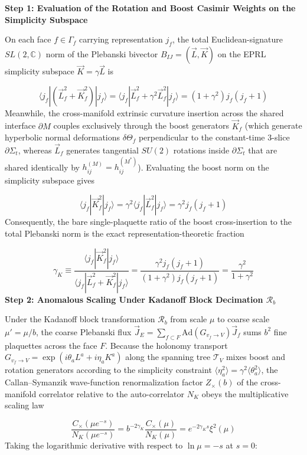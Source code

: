 \documentclass[aps,prd,onecolumn,superscriptaddress,nofootinbib,longbibliography,10pt]{revtex4-2}
\begin{document}
  \textbf{Step 1: Evaluation of the Rotation and Boost Casimir Weights on the Simplicity Subspace}


  On each face \(f \in \Gamma_f\) carrying representation \(j_f\), the total Euclidean-signature \(SL(2,\mathbb{C})\) norm of the Plebanski bivector \(B_{IJ} = (\vec{L}, \vec{K})\) on the EPRL simplicity subspace \(\vec{K} = \gamma\vec{L}\) is


  \[ \langle j_f | \left(\vec{L}_f^2 + \vec{K}_f^2\right) | j_f\rangle = \langle j_f | \vec{L}_f^2 + \gamma^2\vec{L}_f^2 | j_f\rangle = (1 + \gamma^2)j_f(j_f + 1) \]
  Meanwhile, the cross-manifold extrinsic curvature insertion across the shared interface \(\partial M\) couples exclusively through the boost generators \(\vec{K}_f\) (which generate hyperbolic normal deformations \(\delta\Theta_f\) perpendicular to the constant-time 3-slice \(\partial\Sigma_t\), whereas \(\vec{L}_f\) generates tangential \(SU(2)\) rotations inside \(\partial\Sigma_t\) that are shared identically by \(h_{ij}^{(M)} = h_{ij}^{(M^*)}\)). Evaluating the boost norm on the simplicity subspace gives


  \[ \langle j_f | \vec{K}_f^2 | j_f\rangle = \gamma^2\langle j_f | \vec{L}_f^2 | j_f\rangle = \gamma^2 j_f(j_f + 1) \]
  Consequently, the bare single-plaquette ratio of the boost cross-insertion to the total Plebanski norm is the exact representation-theoretic fraction


  \[ \gamma_K \equiv \frac{\langle j_f | \vec{K}_f^2 | j_f\rangle}{\langle j_f | \vec{L}_f^2 + \vec{K}_f^2 | j_f\rangle} = \frac{\gamma^2 j_f(j_f + 1)}{(1 + \gamma^2)j_f(j_f + 1)} = \frac{\gamma^2}{1 + \gamma^2} \]
  \textbf{Step 2: Anomalous Scaling Under Kadanoff Block Decimation \(\mathcal{R}_b\)}


  Under the Kadanoff block transformation \(\mathcal{R}_b\) from scale \(\mu\) to coarse scale \(\mu' = \mu/b\), the coarse Plebanski flux \(\vec{J}_E = \sum_{f\subset F} \text{Ad}(G_{v_f\to V})\vec{J}_f\) sums \(b^2\) fine plaquettes across the face \(F\). Because the holonomy transport \(G_{v_f\to V} = \exp(i\theta_a L^a + i\eta_a K^a)\) along the spanning tree \(\mathcal{T}_V\) mixes boost and rotation generators according to the simplicity constraint \(\langle\eta_a^2\rangle = \gamma^2\langle\theta_a^2\rangle\), the Callan–Symanzik wave-function renormalization factor \(Z_\times(b)\) of the cross-manifold correlator relative to the auto-correlator \(N_K\) obeys the multiplicative scaling law


  \[ \frac{C_\times(\mu e^{-s})}{N_K(\mu e^{-s})} = b^{-2\gamma_K}\frac{C_\times(\mu)}{N_K(\mu)} = e^{-2\gamma_K s}\xi^2(\mu) \]
  Taking the logarithmic derivative with respect to \(\ln\mu = -s\) at \(s = 0\):
\end{document}
